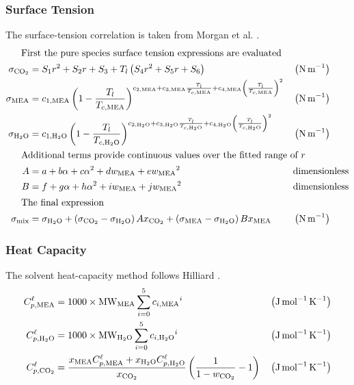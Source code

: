             \subsubsection{Surface Tension}
            The surface-tension correlation is taken from Morgan et al. \cite{Morgan2015}.
                \begin{align}
                    \shortintertext{\quad\; First the pure species surface tension expressions are evaluated}
                    \sigma _{\COtwo} &= S_1 r^2+S_2 r+S_3+T_l \left(S_4 r^2+S_5 r+S_6\right)
                    && \left(\unit{N\,m^{-1}}\right)\\
                    \sigma _{\MEA} &= c_{1,\MEA} \left(1-\frac{T_l}{T_{c,\MEA}}\right)^{c_{2,\MEA}+c_{3,\MEA} \frac{T_l}{T_{c,\MEA}}+c_{4,\MEA} \left(\frac{T_l}{T_{c,\MEA}}\right)^2}
                    && \left(\unit{N\,m^{-1}}\right)\\
                    \sigma _{\HtwoO} &= c_{1,\HtwoO} \left(1-\frac{T_l}{T_{c,\HtwoO}}\right)^{c_{2,\HtwoO}+c_{3,\HtwoO} \frac{T_l}{T_{c,\HtwoO}}+c_{4,\HtwoO} \left(\frac{T_l}{T_{c,\HtwoO}}\right)^2}
                    && \left(\unit{N\,m^{-1}}\right)\\
                    \shortintertext{\quad\; Additional terms provide continuous values over the fitted range of $r$}
                    A &= a+b \alpha+c {\alpha}^2+d w_{\MEA}+e {w_{\MEA}}^2
                    && \text{dimensionless}\\
                    B &= f+g \alpha+h {\alpha}^2+i w_{\MEA}+j {w_{\MEA}}^2
                    && \text{dimensionless}\\
                    \shortintertext{\quad\; The final expression}
                    \sigma _{\text{mix}} &= \sigma_{\HtwoO}+\left(\sigma_{\COtwo}-\sigma_{\HtwoO}\right) A x_{\COtwo}+\left(\sigma_{\MEA}-\sigma_{\HtwoO}\right) B x_{\MEA}
                    && \left(\unit{N\,m^{-1}}\right)
                \end{align}

            \subsubsection{Heat Capacity}
                The solvent heat-capacity method follows Hilliard \cite{Hilliard2008}.
                \begin{align}
                    C^{\liq}_{p,\MEA} &= 1000 \times \text{\text{MW}}_{\MEA} \sum_{i=0}^{5} {c_{i, \MEA}}^{i}
                    && \left(\unit{J\,mol^{-1}\,K^{-1}}\right)\\
                    C^{\liq}_{p,\HtwoO} &= 1000 \times \text{\text{MW}}_{\HtwoO} \sum_{i=0}^{5} {c_{i, \HtwoO}}^{i}
                    && \left(\unit{J\,mol^{-1}\,K^{-1}}\right)\\
                    C^{\liq}_{p,\COtwo} &= \frac{x_{\MEA} C^{\liq}_{p,\MEA} + x_{\HtwoO} C^{\liq}_{p,\HtwoO}}{x_{\COtwo}} \left( \frac{1}{1 - w_{\COtwo}} - 1\right)
                    && \left(\unit{J\,mol^{-1}\,K^{-1}}\right)
                \end{align}

